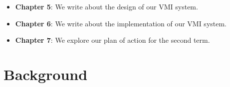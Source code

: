 \documentclass{report}
\begin{document}
\begin{spacing}{1.5}
{\begin{itemize}
    \item \textbf{Chapter 5}: We write about the design of our VMI system.
    
    \item \textbf{Chapter 6}: We write about the implementation of our VMI system.
    
    
    \item \textbf{Chapter 7}: We explore our plan of action for the second term.
    
    \leavevmode\newline
\end{itemize}
}












































































\chapter{Background}


\end{spacing}
\end{document}
